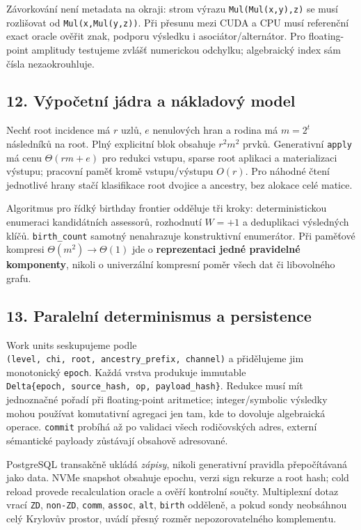 \documentclass[
  10pt,
]{article}
\begin{document}
Závorkování není metadata na okraji: strom výrazu
\texttt{Mul(Mul(x,y),z)} se musí rozlišovat od \texttt{Mul(x,Mul(y,z))}.
Při přesunu mezi CUDA a CPU musí referenční exact oracle ověřit znak,
podporu výsledku i asociátor/alternátor. Pro floating-point amplitudy
testujeme zvlášť numerickou odchylku; algebraický index sám čísla
nezaokrouhluje.

\subsection{12. Výpočetní jádra a nákladový
model}\label{vuxfdpoux10detnuxed-juxe1dra-a-nuxe1kladovuxfd-model}

Nechť root incidence má \(r\) uzlů, \(e\) nenulových hran a rodina má
\(m=2^t\) následníků na root. Plný explicitní blok obsahuje \(r^2m^2\)
prvků. Generativní \texttt{apply} má cenu \(\Theta(rm+e)\) pro redukci
vstupu, sparse root aplikaci a materializaci výstupu; pracovní paměť
kromě vstupu/výstupu \(O(r)\). Pro náhodné čtení jednotlivé hrany stačí
klasifikace root dvojice a ancestry, bez alokace celé matice.

Algoritmus pro řídký birthday frontier odděluje tři kroky:
deterministickou enumeraci kandidátních assessorů, rozhodnutí \(W=+1\) a
deduplikaci výsledných klíčů. \texttt{birth\_count} samotný nenahrazuje
konstruktivní enumerátor. Při paměťové kompresi
\(\Theta(m^2)\to\Theta(1)\) jde o \textbf{reprezentaci jedné pravidelné
komponenty}, nikoli o univerzální kompresní poměr všech dat či
libovolného grafu.

\subsection{13. Paralelní determinismus a
persistence}\label{paralelnuxed-determinismus-a-persistence}

Work units seskupujeme podle
\texttt{(level,\ chi,\ root,\ ancestry\_prefix,\ channel)} a přidělujeme
jim monotonický \texttt{epoch}. Každá vrstva produkuje immutable
\texttt{Delta\{epoch,\ source\_hash,\ op,\ payload\_hash\}}. Redukce
musí mít jednoznačné pořadí při floating-point aritmetice;
integer/symbolic výsledky mohou používat komutativní agregaci jen tam,
kde to dovoluje algebraická operace. \texttt{commit} probíhá až po
validaci všech rodičovských adres, externí sémantické payloady zůstávají
obsahově adresované.

PostgreSQL transakčně ukládá \emph{zápisy}, nikoli generativní pravidla
přepočítávaná jako data. NVMe snapshot obsahuje epochu, verzi sign
rekurze a root hash; cold reload provede recalculation oracle a ověří
kontrolní součty. Multiplexní dotaz vrací \texttt{ZD}, \texttt{non-ZD},
\texttt{comm}, \texttt{assoc}, \texttt{alt}, \texttt{birth} odděleně, a
pokud sondy neobsáhnou celý Krylovův prostor, uvádí přesný rozměr
nepozorovatelného komplementu.
\end{document}
